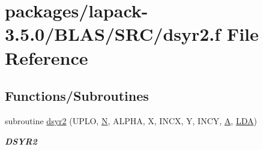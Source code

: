 \hypertarget{lapack-3_85_80_2BLAS_2SRC_2dsyr2_8f}{}\section{packages/lapack-\/3.5.0/\+B\+L\+A\+S/\+S\+R\+C/dsyr2.f File Reference}
\label{lapack-3_85_80_2BLAS_2SRC_2dsyr2_8f}
\subsection*{Functions/\+Subroutines}
\begin{DoxyCompactItemize}
\item 
subroutine \hyperlink{group__double__blas__level2_gae96880c53b8eaee70bbef273b905715f}{dsyr2} (U\+P\+L\+O, \hyperlink{polmisc_8c_a0240ac851181b84ac374872dc5434ee4}{N}, A\+L\+P\+H\+A, X, I\+N\+C\+X, Y, I\+N\+C\+Y, \hyperlink{classA}{A}, \hyperlink{example__user_8c_ae946da542ce0db94dced19b2ecefd1aa}{L\+D\+A})
\begin{DoxyCompactList}\small\item\em {\bfseries D\+S\+Y\+R2} \end{DoxyCompactList}\end{DoxyCompactItemize}

